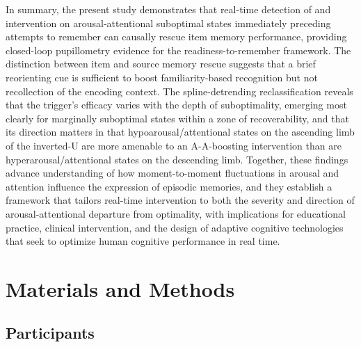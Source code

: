 In summary, the present study demonstrates that real-time detection of and intervention on arousal-attentional suboptimal states immediately preceding attempts to remember can causally rescue item memory performance, providing closed-loop pupillometry evidence for the readiness-to-remember framework. The distinction between item and source memory rescue suggests that a brief reorienting cue is sufficient to boost familiarity-based recognition but not recollection of the encoding context. The spline-detrending reclassification reveals that the trigger's efficacy varies with the depth of suboptimality, emerging most clearly for marginally suboptimal states within a zone of recoverability, and that its direction matters in that hypoarousal/attentional states on the ascending limb of the inverted-U are more amenable to an A-A-boosting intervention than are hyperarousal/attentional states on the descending limb. Together, these findings advance understanding of how moment-to-moment fluctuations in arousal and attention influence the expression of episodic memories, and they establish a framework that tailors real-time intervention to both the severity and direction of arousal-attentional departure from optimality, with implications for educational practice, clinical intervention, and the design of adaptive cognitive technologies that seek to optimize human cognitive performance in real time.

\section{Materials and Methods}\label{sec:methods}

\subsection{Participants}

